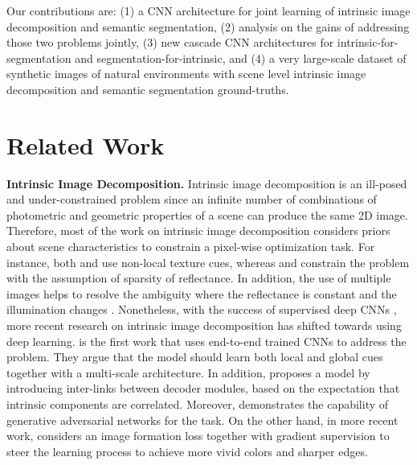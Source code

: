 \documentclass[runningheads]{llncs}
\begin{document}
Our contributions are: (1) a CNN architecture for joint learning of intrinsic image decomposition and semantic segmentation, (2) analysis on the gains of addressing those two problems jointly, (3) new cascade CNN architectures for intrinsic-for-segmentation and segmentation-for-intrinsic, and (4) a very large-scale dataset of synthetic images of natural environments with scene level intrinsic image decomposition and semantic segmentation ground-truths.

\section{Related Work}
\textbf{Intrinsic Image Decomposition.} 
Intrinsic image decomposition is an ill-posed and under-constrained problem since an infinite number of combinations of photometric and geometric properties of a scene can produce the same 2D image. Therefore, most of the work on intrinsic image decomposition considers priors about scene characteristics to constrain a pixel-wise optimization task. For instance, both \cite{shen} and \cite{zhao} use non-local texture cues, whereas \cite{gehler} and \cite{shen2} constrain the problem with the assumption of sparsity of reflectance. In addition, the use of multiple images helps to resolve the ambiguity where the reflectance is constant and the illumination changes \cite{weiss,matsushita}. Nonetheless, with the success of supervised deep CNNs \cite{vggnet,rcnn}, more recent research on intrinsic image decomposition has shifted towards using deep learning. \cite{narihia} is the first work that uses end-to-end trained CNNs to address the problem. They argue that the model should learn both local and global cues together with a multi-scale architecture. In addition, \cite{shi} proposes a model by introducing inter-links between decoder modules, based on the expectation that intrinsic components are correlated. Moreover, \cite{lettry} demonstrates the capability of generative adversarial networks for the task. On the other hand, in more recent work, \cite{baslamisli} considers an image formation loss together with gradient supervision to steer the learning process to achieve more vivid colors and sharper edges. 
\end{document}

